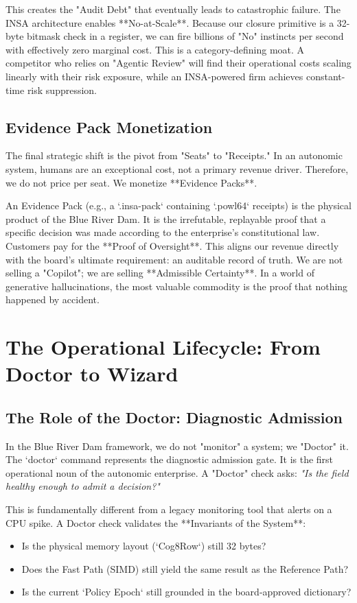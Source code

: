 \documentclass[12pt,a4paper,oneside]{book}
\begin{document}
This creates the "Audit Debt" that eventually leads to catastrophic failure. The INSA architecture enables **No-at-Scale**. Because our closure primitive is a 32-byte bitmask check in a register, we can fire billions of "No" instincts per second with effectively zero marginal cost. This is a category-defining moat. A competitor who relies on "Agentic Review" will find their operational costs scaling linearly with their risk exposure, while an INSA-powered firm achieves constant-time risk suppression.

\section{Evidence Pack Monetization}
The final strategic shift is the pivot from "Seats" to "Receipts." In an autonomic system, humans are an exceptional cost, not a primary revenue driver. Therefore, we do not price per seat. We monetize **Evidence Packs**. 

An Evidence Pack (e.g., a `.insa-pack` containing `.powl64` receipts) is the physical product of the Blue River Dam. It is the irrefutable, replayable proof that a specific decision was made according to the enterprise’s constitutional law. Customers pay for the **Proof of Oversight**. This aligns our revenue directly with the board's ultimate requirement: an auditable record of truth. We are not selling a "Copilot"; we are selling **Admissible Certainty**. In a world of generative hallucinations, the most valuable commodity is the proof that nothing happened by accident.

\chapter{The Operational Lifecycle: From Doctor to Wizard}

\section{The Role of the Doctor: Diagnostic Admission}
In the Blue River Dam framework, we do not "monitor" a system; we "Doctor" it. The `doctor` command represents the diagnostic admission gate. It is the first operational noun of the autonomic enterprise. A "Doctor" check asks: \textit{"Is the field healthy enough to admit a decision?"} 

This is fundamentally different from a legacy monitoring tool that alerts on a CPU spike. A Doctor check validates the **Invariants of the System**:
\begin{itemize}
    \item Is the physical memory layout (`Cog8Row`) still 32 bytes?
    \item Does the Fast Path (SIMD) still yield the same result as the Reference Path?
    \item Is the current `Policy Epoch` still grounded in the board-approved dictionary?
\end{itemize}
\end{document}
